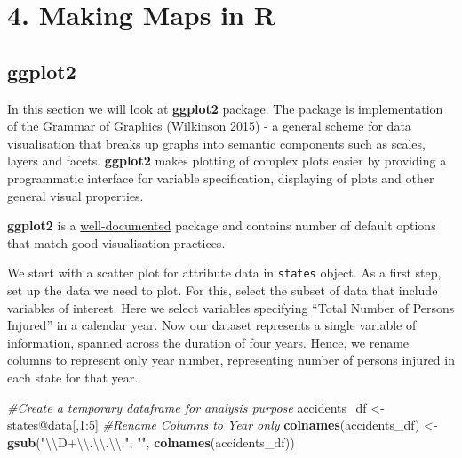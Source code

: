 \documentclass[]{article}
\newenvironment{Shaded}{}{}
\newcommand{\CharTok}[1]{\textcolor[rgb]{0.25,0.44,0.63}{#1}}
\newcommand{\CommentTok}[1]{\textcolor[rgb]{0.38,0.63,0.69}{\textit{#1}}}
\newcommand{\DecValTok}[1]{\textcolor[rgb]{0.25,0.63,0.44}{#1}}
\newcommand{\KeywordTok}[1]{\textcolor[rgb]{0.00,0.44,0.13}{\textbf{#1}}}
\newcommand{\NormalTok}[1]{#1}
\newcommand{\OperatorTok}[1]{\textcolor[rgb]{0.40,0.40,0.40}{#1}}
\newcommand{\StringTok}[1]{\textcolor[rgb]{0.25,0.44,0.63}{#1}}
\begin{document}
\clearpage

\hypertarget{making-maps-in-r}{%
\section{4. Making Maps in R}\label{making-maps-in-r}}

\hypertarget{ggplot2}{%
\subsection{ggplot2}\label{ggplot2}}

In this section we will look at \textbf{ggplot2} package. The package is
implementation of the Grammar of Graphics (Wilkinson 2015) - a general
scheme for data visualisation that breaks up graphs into semantic
components such as scales, layers and facets. \textbf{ggplot2} makes
plotting of complex plots easier by providing a programmatic interface
for variable specification, displaying of plots and other general visual
properties.

\textbf{ggplot2} is a
\href{http://docs.ggplot2.org/current/}{well-documented} package and
contains number of default options that match good visualisation
practices.

We start with a scatter plot for attribute data in \texttt{states}
object. As a first step, set up the data we need to plot. For this,
select the subset of data that include variables of interest. Here we
select variables specifying ``Total Number of Persons Injured'' in a
calendar year. Now our dataset represents a single variable of
information, spanned across the duration of four years. Hence, we rename
columns to represent only year number, representing number of persons
injured in each state for that year.

\begin{Shaded}
\begin{Highlighting}[]
\CommentTok{#Create a temporary dataframe for analysis purpose}
\NormalTok{accidents_df <-}\StringTok{ }\NormalTok{states}\OperatorTok{@}\NormalTok{data[,}\DecValTok{1}\OperatorTok{:}\DecValTok{5}\NormalTok{]}
\CommentTok{#Rename Columns to Year only}
\KeywordTok{colnames}\NormalTok{(accidents_df) <-}\StringTok{ }\KeywordTok{gsub}\NormalTok{(}\StringTok{"}\CharTok{\textbackslash{}\textbackslash{}}\StringTok{D+}\CharTok{\textbackslash{}\textbackslash{}}\StringTok{.}\CharTok{\textbackslash{}\textbackslash{}}\StringTok{.}\CharTok{\textbackslash{}\textbackslash{}}\StringTok{."}\NormalTok{, }\StringTok{""}\NormalTok{, }\KeywordTok{colnames}\NormalTok{(accidents_df))}
\end{Highlighting}
\end{Shaded}
\end{document}
